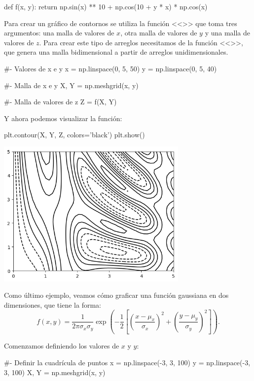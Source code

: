 \begin{pyin}
def f(x, y):
    return np.sin(x) ** 10 + np.cos(10 + y * x) * np.cos(x)  
\end{pyin}

Para crear un gráfico de contornos se utiliza la función <<>> que toma tres argumentos: una malla de valores de $ x $, otra malla de valores de $ y $ y una malla de valores de $ z $. Para crear este tipo de arreglos necesitamos de la función <<>>, que genera una malla bidimensional a partir de arreglos unidimensionales.

\begin{pyin}[]
#- Valores de x e y
x = np.linspace(0, 5, 50)
y = np.linspace(0, 5, 40)

#- Malla de x e y
X, Y = np.meshgrid(x, y)

#- Malla de valores de z
Z = f(X, Y)
\end{pyin}

Y ahora podemos visualizar la función:

\begin{pyin}
plt.contour(X, Y, Z, colors='black')
plt.show()
\end{pyin}

\noindent
\includegraphics[width=0.7\textwidth]{figures/matplotlib_contour.png}

Como último ejemplo, veamos cómo graficar una función gaussiana en dos dimensiones, que tiene la forma:
\[
f(x, y) = \frac{1}{2\pi\sigma_x\sigma_y} \exp\left(-\frac{1}{2}\left[\left(\frac{x - \mu_x}{\sigma_x}\right)^2 + \left(\frac{y - \mu_y}{\sigma_y}\right)^2\right]\right).
\]

Comenzamos definiendo los valores de $ x $ y $ y $:
\begin{pyin}[]
#- Definir la cuadrícula de puntos
x = np.linspace(-3, 3, 100)
y = np.linspace(-3, 3, 100)
X, Y = np.meshgrid(x, y)
\end{pyin}

